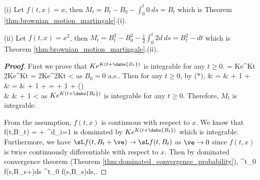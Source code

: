 \begin{example}
\ben
\item [(i)] Let $f(t,x) = x$, then $M_t = B_t - B_0 - \int^t_0 0\ ds = B_t$ which is Theorem \ref{thm:brownian_motion_martingale}.(i).

\item [(ii)] Let $f(t,x) = x^2$, then $M_t = B_t^2 - B_0^2 - \frac 12 \int^t_0 2d\ ds = B_t^2 - dt$ which is Theorem \ref{thm:brownian_motion_martingale}.(ii).
\een
\end{example}

\begin{proof}[\bf Proof]
First we prove that $K e^{K(t+\dabs{B_t})}$ is integrable for any $t\geq 0$.
\be
\E{} = Ke^{Kt} \E{} \leq 2Ke^{Kt} \E{} = 2Ke^{2Kt}\E{} < \infty
\ee
as $B_0 = 0$ a.s.. Then for any $t\geq 0$, by ($*$),
\beast
\E{} & = & \E{} \leq \E{} + 1 + \E{} \\
& = & \E{} + 1 + \E{} = \E{} + 1 + \E{}\qquad (\dag)\\
& \leq & \E{} + 1 < \infty
\eeast
as $K e^{K(t+\dabs{B_t})}$ is integrable for any $t\geq 0$. Therefore, $M_t$ is integrable.

From the assumption, $f(t,x)$ is continuous with respect to $x$. We know that
\be
\sL f(t,B_t) =  +  \sum^d_{i=1} 
\ee
is dominated by $K e^{K(t+\dabs{B_t})}$ which is integrable. Furthermore, we have $\sL f(t,B_t+\ve) \to \sL f(t,B_t)$ as $\ve\to 0$ since $f(t,x)$ is twice continuously differentiable with respect to $x$. Then by dominated convergence theorem (Theorem \ref{thm:dominated_convergence_probability}),
\be
\int^t_0 \sL f(s,B_s+\ve)ds \to \int^t_0 \sL f(s,B_s)ds,\qquad {}\ve {}.
\ee


\end{proof}
